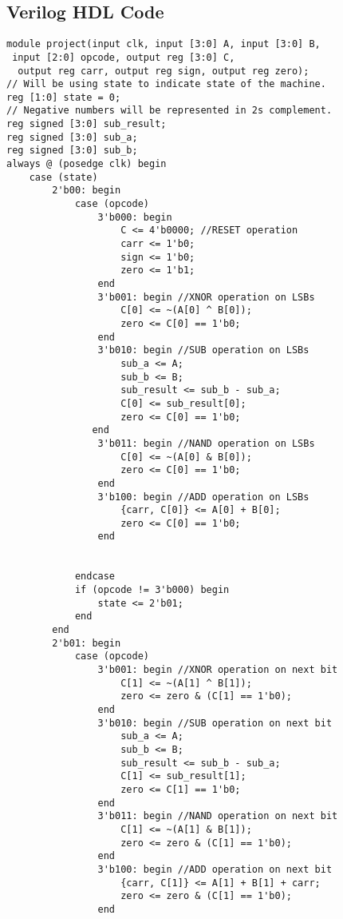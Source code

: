 
\subsection{Verilog HDL Code}\label{subsec:verilog-hdl-code}
\begin{lstlisting}[style=verilogStyle, caption={Verilog code for 4-bit ALU},label={lst: Verilog HDL Code for 4-bit ALU}]
module project(input clk, input [3:0] A, input [3:0] B,
 input [2:0] opcode, output reg [3:0] C,
  output reg carr, output reg sign, output reg zero);
// Will be using state to indicate state of the machine.
reg [1:0] state = 0;
// Negative numbers will be represented in 2s complement.
reg signed [3:0] sub_result;
reg signed [3:0] sub_a;
reg signed [3:0] sub_b;
always @ (posedge clk) begin
    case (state)
        2'b00: begin
            case (opcode)
                3'b000: begin
                    C <= 4'b0000; //RESET operation
                    carr <= 1'b0;
                    sign <= 1'b0;
                    zero <= 1'b1;
                end
                3'b001: begin //XNOR operation on LSBs
                    C[0] <= ~(A[0] ^ B[0]);
                    zero <= C[0] == 1'b0;
                end
                3'b010: begin //SUB operation on LSBs
					sub_a <= A;
					sub_b <= B;
                    sub_result <= sub_b - sub_a;
                    C[0] <= sub_result[0];
                    zero <= C[0] == 1'b0;
               end
                3'b011: begin //NAND operation on LSBs
                    C[0] <= ~(A[0] & B[0]);
                    zero <= C[0] == 1'b0;
                end
                3'b100: begin //ADD operation on LSBs
                    {carr, C[0]} <= A[0] + B[0];
                    zero <= C[0] == 1'b0;
                end


            endcase
            if (opcode != 3'b000) begin
				state <= 2'b01;
			end
        end
        2'b01: begin
            case (opcode)
                3'b001: begin //XNOR operation on next bit
                    C[1] <= ~(A[1] ^ B[1]);
                    zero <= zero & (C[1] == 1'b0);
                end
                3'b010: begin //SUB operation on next bit
					sub_a <= A;
					sub_b <= B;
                    sub_result <= sub_b - sub_a;
                    C[1] <= sub_result[1];
                    zero <= C[1] == 1'b0;
                end
                3'b011: begin //NAND operation on next bit
                    C[1] <= ~(A[1] & B[1]);
                    zero <= zero & (C[1] == 1'b0);
                end
                3'b100: begin //ADD operation on next bit
                    {carr, C[1]} <= A[1] + B[1] + carr;
                    zero <= zero & (C[1] == 1'b0);
                end



\end{lstlisting}

